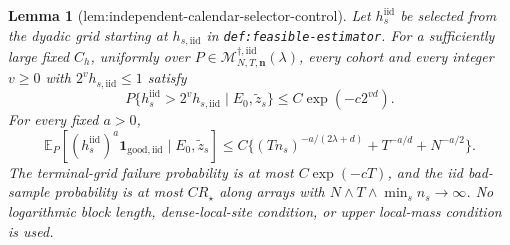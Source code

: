 \documentclass{article}
\newtheorem{lemma}{Lemma}
\begin{document}
\begin{lemma}[lem:independent-calendar-selector-control]\label{lem:independent-calendar-selector-control}
Let \(h_s^{\mathrm{iid}}\) be selected from the dyadic grid starting at \(h_{s,\mathrm{iid}}\) in \texttt{def:feasible-estimator}.  For a sufficiently large fixed \(C_h\), uniformly over \(P\in\mathcal M_{N,T,\mathbf n}^{\dagger,\mathrm{iid}}(\lambda)\), every cohort and every integer \(v\ge0\) with \(2^vh_{s,\mathrm{iid}}\le1\) satisfy
\[
P\{h_s^{\mathrm{iid}}>2^vh_{s,\mathrm{iid}}\mid E_0,\widetilde z_s\}
\le C\exp(-c2^{vd}).
\]
For every fixed \(a>0\),
\[
\mathbb E_P[(h_s^{\mathrm{iid}})^a\mathbf1_{\mathrm{good,iid}}\mid E_0,\widetilde z_s]
\le C\{(Tn_s)^{-a/(2\lambda+d)}+T^{-a/d}+N^{-a/2}\}.
\]
The terminal-grid failure probability is at most \(C\exp(-cT)\), and the iid bad-sample probability is at most \(CR_\star\) along arrays with \(N\wedge T\wedge\min_s n_s\to\infty\).  No logarithmic block length, dense-local-site condition, or upper local-mass condition is used.
\end{lemma}
\end{document}
